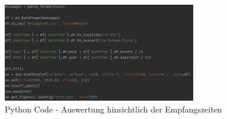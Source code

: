





\begin{figure}
    \centering
    \includegraphics[width=0.75\textwidth]{images/Auswertung_Zeiten.PNG}
    \caption{Python Code - Auswertung hinsichtlich der Empfangszeiten} 
    \label{fig:emailsdatetime}
\end{figure}